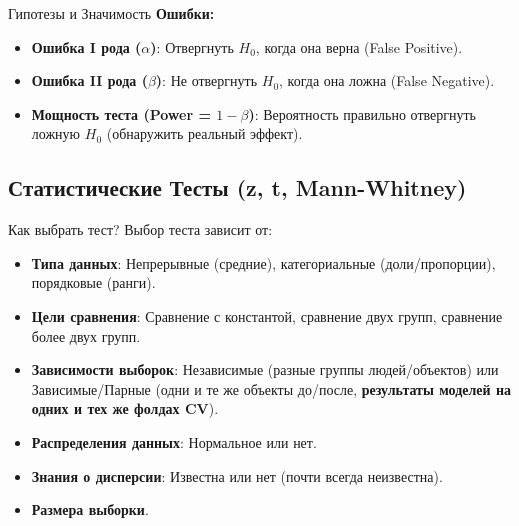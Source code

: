 \begin{textbox}{Гипотезы и Значимость}
\textbf{Ошибки:}
\begin{itemize}
    \item \textbf{Ошибка I рода ($\alpha$)}: Отвергнуть $H_0$, когда она верна (False Positive).
    \item \textbf{Ошибка II рода ($\beta$)}: Не отвергнуть $H_0$, когда она ложна (False Negative).
    \item \textbf{Мощность теста (Power = $1-\beta$)}: Вероятность правильно отвергнуть ложную $H_0$ (обнаружить реальный эффект).
\end{itemize}
\end{textbox}

\subsection{Статистические Тесты (z, t, Mann-Whitney)}

\begin{myblock}{Как выбрать тест?}
Выбор теста зависит от:
\begin{itemize}
    \item \textbf{Типа данных}: Непрерывные (средние), категориальные (доли/пропорции), порядковые (ранги).
    \item \textbf{Цели сравнения}: Сравнение с константой, сравнение двух групп, сравнение более двух групп.
    \item \textbf{Зависимости выборок}: Независимые (разные группы людей/объектов) или Зависимые/Парные (одни и те же объекты до/после, \textbf{результаты моделей на одних и тех же фолдах CV}).
    \item \textbf{Распределения данных}: Нормальное или нет.
    \item \textbf{Знания о дисперсии}: Известна или нет (почти всегда неизвестна).
    \item \textbf{Размера выборки}.
\end{itemize}
\end{myblock}

